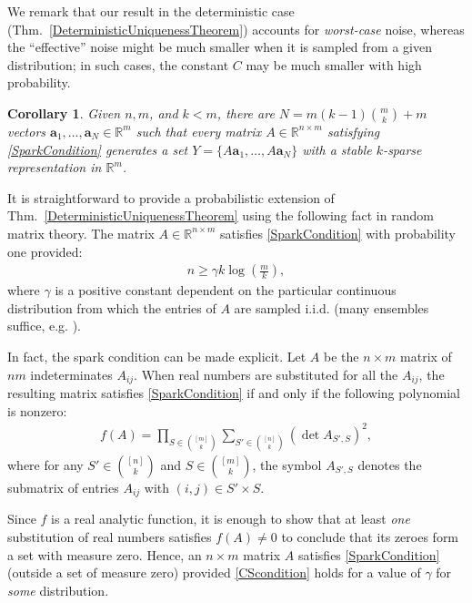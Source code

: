 \documentclass[journal, twocolumn]{IEEEtran}
\newtheorem{corollary}{Corollary}
\begin{document}
We remark that our result in the deterministic case (Thm.~\ref{DeterministicUniquenessTheorem}) accounts for \emph{worst-case} noise, whereas the ``effective'' noise might be much smaller when it is sampled from a given distribution; in such cases, the constant $C$ may be much smaller with high probability. 


\begin{corollary}\label{DeterministicUniquenessCorollary}
Given $n, m$, and $k < m$, there are $N =  m(k-1){m \choose k}+m$ vectors \mbox{$\mathbf{a}_1, \ldots, \mathbf{a}_N \in \mathbb{R}^m$} such that every matrix $A \in \mathbb{R}^{n \times m}$ satisfying \eqref{SparkCondition} generates a set $Y = \{A\mathbf{a}_1, \ldots, A\mathbf{a}_N\}$ with a stable $k$-sparse representation in $\mathbb R^m$.
\end{corollary}

It is straightforward to provide a probabilistic extension of Thm.~\ref{DeterministicUniquenessTheorem} using the following fact in random matrix theory.  The matrix $A \in \mathbb{R}^{n \times m}$ satisfies \eqref{SparkCondition} with probability one
provided:
\begin{align}\label{CScondition}
n \geq \gamma k\log\left(\frac{m}{k}\right),
\end{align}
where $\gamma$ is a positive constant dependent on the particular continuous distribution from which the entries of $A$ are sampled i.i.d. (many ensembles suffice, e.g. \cite[Sec.~4]{Baraniuk08}). 

In fact, the spark condition can be made explicit.  Let $A$  be the $n \times m$ matrix of $nm$ indeterminates $A_{ij}$. When real numbers are substituted for all the $A_{ij}$, the resulting matrix satisfies \eqref{SparkCondition} if and only if the following polynomial is nonzero:
\begin{align*}
f(A) = \prod_{S \in {[m] \choose k}} \sum_{S' \in {[n] \choose k}} (\det A_{S',S})^2,
\end{align*}
%
where for any $S' \in {[n] \choose k}$ and $S \in {[m] \choose k}$, the symbol $A_{S',S}$ denotes the submatrix of entries $A_{ij}$ with $(i,j) \in S' \times S$. 

Since $f$ is a real analytic function, it is enough to show that at least \emph{one} substitution of real numbers satisfies $f(A) \neq 0$ to conclude that its zeroes form a set with measure zero. Hence, an $n \times m$ matrix $A$ satisfies \eqref{SparkCondition} (outside a set of measure zero) provided \eqref{CScondition} holds for a value of $\gamma$ for \emph{some}  distribution. 
\end{document}
